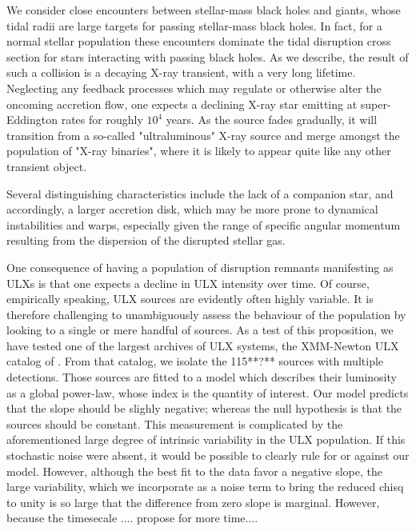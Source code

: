 We consider close encounters between stellar-mass black holes and giants, whose tidal radii are large targets for passing stellar-mass black holes.  In fact, for a normal stellar population these encounters dominate the tidal disruption cross section for stars interacting with passing black holes.  As we describe, the result of such a collision is a decaying X-ray transient, with a very long lifetime.  Neglecting any feedback processes which may regulate or otherwise alter the oncoming accretion flow, one expects a declining X-ray star emitting at super-Eddington rates for roughly $10^4$ years.  As the source fades gradually, it will transition from a so-called "ultraluminous" X-ray source and merge amongst the population of "X-ray binaries", where it is likely to appear quite like any other transient object. 

Several distinguishing characteristics include the lack of a companion star, and accordingly, a larger accretion disk, which may be more prone to dynamical instabilities and warps, especially given the range of specific angular momentum resulting from the dispersion of the disrupted stellar gas.

One consequence of having a population of disruption remnants manifesting as ULXs is that one expects a decline in ULX intensity over time.  Of course, empirically speaking, ULX sources are evidently often highly variable.  It is therefore challenging to unambiguously assess the behaviour of the population by looking to a single or mere handful of sources.  As a test of this proposition, we have tested one of the largest archives of ULX systems, the XMM-Newton ULX catalog of \citep{Walton_2012}.  From that catalog, we isolate the 115**?** sources with multiple detections.  Those sources are fitted to a model which describes their luminosity as a global power-law, whose index is the quantity of interest.  Our model predicts that the slope should be slighly negative; whereas the null hypothesis is that the sources should be constant.   This measurement is complicated by the aforementioned large degree of intrinsic variability in the ULX population.  If this stochastic noise were absent, it would be possible to clearly rule for or against our model.  However, although the best fit to the data favor a negative slope, the large variability, which we incorporate as a noise term to bring the reduced chisq to unity is so large that the difference from zero slope is marginal.  However, because the timesecale .... propose for more time....







